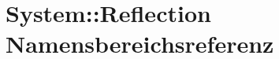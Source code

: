 \hypertarget{namespaceSystem_1_1Reflection}{
\section{System::Reflection Namensbereichsreferenz}
\label{namespaceSystem_1_1Reflection}
}




